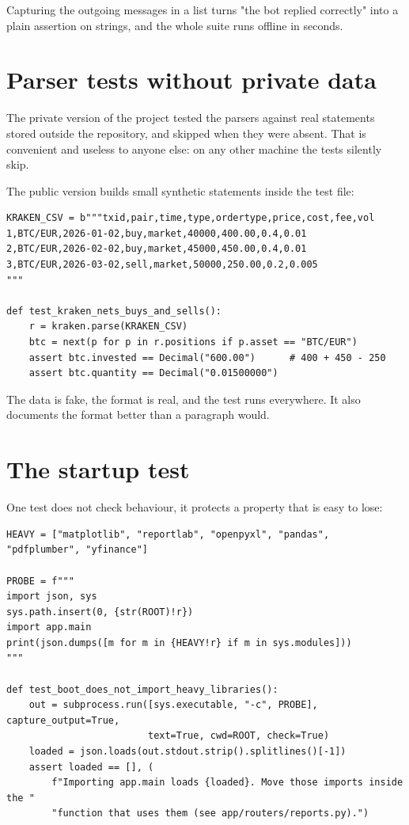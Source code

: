 Capturing the outgoing messages in a list turns "the bot replied correctly" into
a plain assertion on strings, and the whole suite runs offline in seconds.

\section{Parser tests without private data}

The private version of the project tested the parsers against real statements
stored outside the repository, and skipped when they were absent. That is
convenient and useless to anyone else: on any other machine the tests silently
skip.

The public version builds small synthetic statements inside the test file:

\begin{lstlisting}[style=py]
KRAKEN_CSV = b"""txid,pair,time,type,ordertype,price,cost,fee,vol
1,BTC/EUR,2026-01-02,buy,market,40000,400.00,0.4,0.01
2,BTC/EUR,2026-02-02,buy,market,45000,450.00,0.4,0.01
3,BTC/EUR,2026-03-02,sell,market,50000,250.00,0.2,0.005
"""

def test_kraken_nets_buys_and_sells():
    r = kraken.parse(KRAKEN_CSV)
    btc = next(p for p in r.positions if p.asset == "BTC/EUR")
    assert btc.invested == Decimal("600.00")      # 400 + 450 - 250
    assert btc.quantity == Decimal("0.01500000")
\end{lstlisting}

The data is fake, the format is real, and the test runs everywhere. It also
documents the format better than a paragraph would.

\section{The startup test}

One test does not check behaviour, it protects a property that is easy to lose:

\begin{lstlisting}[style=py]
HEAVY = ["matplotlib", "reportlab", "openpyxl", "pandas", "pdfplumber", "yfinance"]

PROBE = f"""
import json, sys
sys.path.insert(0, {str(ROOT)!r})
import app.main
print(json.dumps([m for m in {HEAVY!r} if m in sys.modules]))
"""

def test_boot_does_not_import_heavy_libraries():
    out = subprocess.run([sys.executable, "-c", PROBE], capture_output=True,
                         text=True, cwd=ROOT, check=True)
    loaded = json.loads(out.stdout.strip().splitlines()[-1])
    assert loaded == [], (
        f"Importing app.main loads {loaded}. Move those imports inside the "
        "function that uses them (see app/routers/reports.py).")
\end{lstlisting}

